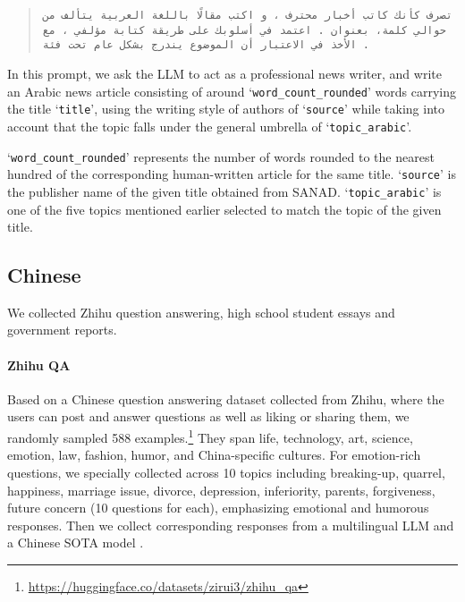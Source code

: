 \begin{quote}
    \small
    \begin{RLtext}
    \texttt{تصرف كأنك كاتب أخبار محترف ، و اكتب مقالًا باللغة العربية يتألف من حوالي  كلمة، بعنوان . اعتمد في أسلوبك على طريقة كتابة مؤلفي ، مع الأخذ في الاعتبار أن الموضوع يندرج بشكل عام تحت فئة .}
\end{RLtext}
\end{quote}


In this prompt, we ask the LLM to act as a professional news writer, and write an Arabic news article consisting of around  `\texttt{word\_count\_rounded}' words carrying the title `\texttt{title}', using the writing style of authors of `\texttt{source}' while taking into account that the topic falls under the general umbrella of `\texttt{topic\_arabic}'. 

`\texttt{word\_count\_rounded}' represents the number of words rounded to the nearest hundred of the corresponding human-written article for the same title. `\texttt{source}' is the publisher name of the given title obtained from SANAD. `\texttt{topic\_arabic}' is one of the five topics mentioned earlier selected to match the topic of the given title.


\subsection{Chinese}
We collected Zhihu question answering, high school student essays and government reports.

\paragraph{Zhihu QA}
Based on a Chinese question answering dataset collected from Zhihu, where the users can post and answer questions as well as liking or sharing them, we randomly sampled 588 examples.\footnote{\url{https://huggingface.co/datasets/zirui3/zhihu_qa}} 
They span life, technology, art, science, emotion, law, fashion, humor, and China-specific cultures. 
For emotion-rich questions, we specially collected across 10 topics including breaking-up, quarrel, happiness, marriage issue, divorce, depression, inferiority, parents, forgiveness, future concern (10 questions for each), emphasizing emotional and humorous responses.
Then we collect corresponding responses from a multilingual LLM \gptfouro and a Chinese SOTA model \qwenturbo.

